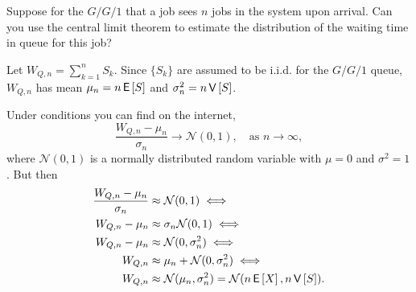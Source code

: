 \begin{exercise}[\faCalculator]
  Suppose for the $G/G/1$ that a job sees $n$ jobs in the system upon arrival.
  Can you use the central limit theorem to estimate  the distribution of the waiting time in queue for this job?
  \begin{hint}
    Let $W_{Q,n} = \sum_{k=1}^n S_k$.
    Since $\{S_k\}$ are assumed to be i.i.d.
    for the $G/G/1$ queue,  $W_{Q,n}$ has mean $\mu_n = n \,\mathsf{E}\left[S\right]$ and $\sigma_n^2 = n\,\mathsf{V}\left[S\right]$.
  \end{hint}
  \begin{solution} Under conditions you can find on the internet,
    \begin{equation*}
    \frac{W_{Q,n} - \mu_n}{\sigma_n} \to \mathcal{N}(0,1), \quad\text{as } n\to \infty,
    \end{equation*}
    where $\mathcal{N}(0,1)$ is a normally distributed random variable
    with $\mu=0$ and $\sigma^2=1$. But then 
    \begin{align*}
    \frac{W_{Q,n} - \mu_n}{\sigma_n} &\approx  \mathcal{N}(0,1)  \iff\\
    W_{Q,n} - \mu_n &\approx  \sigma_n \mathcal{N}(0,1)  \iff\\
    W_{Q,n} - \mu_n &\approx  \mathcal{N}(0,\sigma_n^2)  \iff\\
    W_{Q,n}  &\approx   \mu_n  + \mathcal{N}(0,\sigma_n^2)  \iff\\
    W_{Q,n}  &\approx    \mathcal{N}(\mu_n,\sigma_n^2) = \mathcal{N}(n\,\mathsf{E}\left[X\right], n \,\mathsf{V}\left[S\right]).
    \end{align*}
\end{solution}
\end{exercise}




